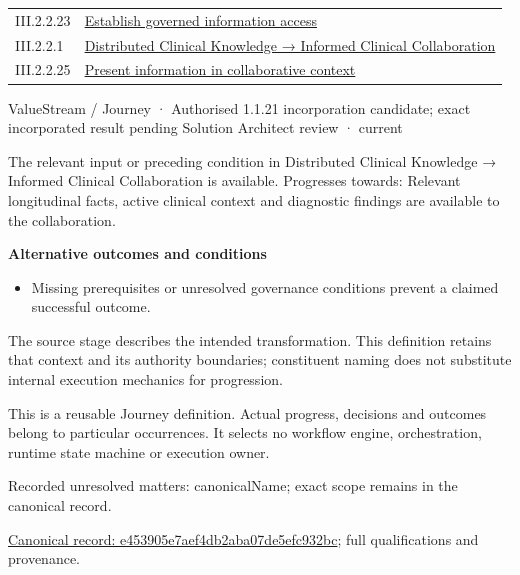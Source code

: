 \begin{longtable}{p{.22\linewidth}p{.73\linewidth}}
III.2.2.23 & \hyperref[element:26719186d6444b5b80029fbf13ae7d06]{Establish governed information access} \\
III.2.2.1 & \hyperref[element:3ba98c0c1170458f8c02fa76694fee67]{Distributed Clinical Knowledge → Informed Clinical Collaboration} \\
III.2.2.25 & \hyperref[element:e0a57481d1d343d48abc3357053576bb]{Present information in collaborative context} \\
\end{longtable}
\label{element:e453905e7aef4db2aba07de5efc932bc}
{\small ValueStream / Journey · Authorised 1.1.21 incorporation candidate; exact incorporated result pending Solution Architect review · current}\par

The relevant input or preceding condition in Distributed Clinical Knowledge → Informed Clinical Collaboration is available. Progresses towards: Relevant longitudinal facts, active clinical context and diagnostic findings are available to the collaboration.



\par\medskip\textbf{Alternative outcomes and conditions}\par


\begin{itemize}


\item Missing prerequisites or unresolved governance conditions prevent a claimed successful outcome.

\end{itemize}


The source stage describes the intended transformation. This definition retains that context and its authority boundaries; constituent naming does not substitute internal execution mechanics for progression.



This is a reusable Journey definition. Actual progress, decisions and outcomes belong to particular occurrences. It selects no workflow engine, orchestration, runtime state machine or execution owner.


{\small Recorded unresolved matters: canonicalName; exact scope remains in the canonical record.}\par
{\footnotesize \href{../../../../continuum/strategy/value-stream/e453905e7aef4db2aba07de5efc932bc.md}{Canonical record: e453905e7aef4db2aba07de5efc932bc}; full qualifications and provenance.}\par
